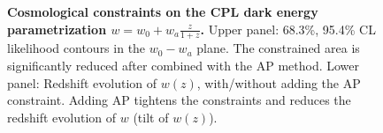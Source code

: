 \documentclass{natureprintstyle}
\begin{document}
\begin{figure}[tb]
   \caption{\label{fig_con}
   {\bf Cosmological constraints on the CPL dark energy parametrization $w=w_0+w_a\frac{z}{1+z}$.}
   Upper panel: 68.3\%, 95.4\% CL likelihood contours in the  $w_0-w_a$ plane.
   The constrained area is significantly reduced after combined with the AP method.
   Lower panel: Redshift evolution of $w(z)$, with/without adding the AP constraint.
   Adding AP tightens the constraints and reduces the redshift evolution of $w$ (tilt of $w(z)$).
   }
\end{figure}
\end{document}
